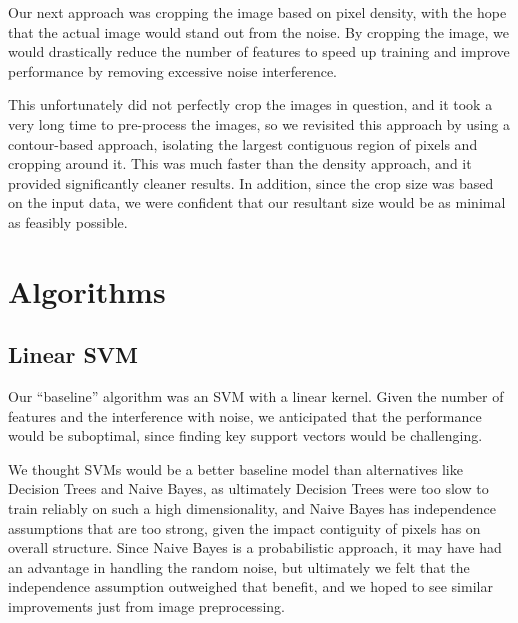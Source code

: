 \documentclass[conference]{IEEEtran}
\begin{document}
Our next approach was cropping the image based on pixel density, with the hope that the actual image would stand out from the noise. By cropping the image, we would drastically reduce the number of features to speed up training and improve performance by removing excessive noise interference.

This unfortunately did not perfectly crop the images in question, and it took a very long time to pre-process the images, so we revisited this approach by using a contour-based approach, isolating the largest contiguous region of pixels and cropping around it. This was much faster than the density approach, and it provided significantly cleaner results. In addition, since the crop size was based on the input data, we were confident that our resultant size would be as minimal as feasibly possible.

\section{Algorithms}

\subsection{Linear SVM}

Our ``baseline'' algorithm was an SVM with a linear kernel. Given the number of features and the interference with noise, we anticipated that the performance would be suboptimal, since finding key support vectors would be challenging.

We thought SVMs would be a better baseline model than alternatives like Decision Trees and Naive Bayes, as ultimately Decision Trees were too slow to train reliably on such a high dimensionality, and Naive Bayes has independence assumptions that are too strong, given the impact contiguity of pixels has on overall structure. Since Naive Bayes is a probabilistic approach, it may have had an advantage in handling the random noise, but ultimately we felt that the independence assumption outweighed that benefit, and we hoped to see similar improvements just from image preprocessing.
\end{document}
